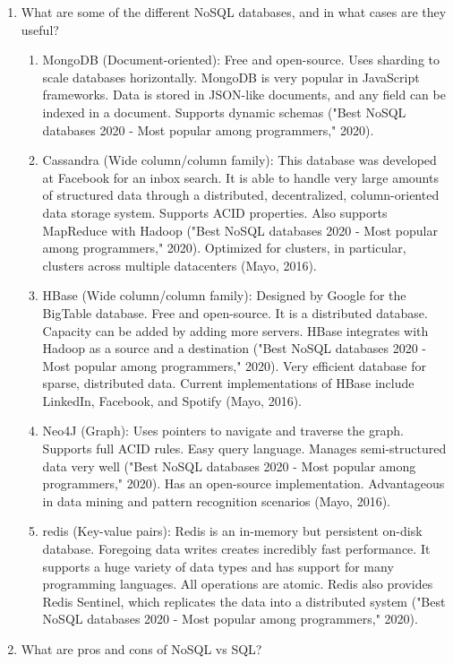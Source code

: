 \documentclass[]{article}
\begin{document}
\begin{enumerate}
	\item What are some of the different NoSQL databases, and in what cases are they useful?

	\begin{enumerate}
		\item MongoDB (Document-oriented): Free and open-source.  Uses sharding to scale databases horizontally.  MongoDB is very popular in JavaScript frameworks.  Data is stored in JSON-like documents, and any field can be indexed in a document.  Supports dynamic schemas ("Best NoSQL databases 2020 - Most popular among programmers," 2020).
		\item Cassandra (Wide column/column family):  This database was developed at Facebook for an inbox search.  It is able to handle very large amounts of structured data through a distributed, decentralized, column-oriented data storage system.  Supports ACID properties.  Also supports MapReduce with Hadoop ("Best NoSQL databases 2020 - Most popular among programmers," 2020).  Optimized for clusters, in particular, clusters across multiple datacenters (Mayo, 2016).
		\item HBase (Wide column/column family): Designed by Google for the BigTable database.  Free and open-source.  It is a distributed database.  Capacity can be added by adding more servers.  HBase integrates with Hadoop as a source and a destination ("Best NoSQL databases 2020 - Most popular among programmers," 2020).  Very efficient database for sparse, distributed data.  Current implementations of HBase include LinkedIn, Facebook, and Spotify (Mayo, 2016).
		\item Neo4J (Graph): Uses pointers to navigate and traverse the graph.  Supports full ACID rules.  Easy query language.  Manages semi-structured data very well ("Best NoSQL databases 2020 - Most popular among programmers," 2020).  Has an open-source implementation.  Advantageous in data mining and pattern recognition scenarios (Mayo, 2016).
		\item redis (Key-value pairs): Redis is an in-memory but persistent on-disk database.  Foregoing data writes creates incredibly fast performance.  It supports a huge variety of data types and has support for many programming languages.  All operations are atomic. Redis also provides Redis Sentinel, which replicates the data into a distributed system ("Best NoSQL databases 2020 - Most popular among programmers," 2020).
	\end{enumerate}
	
	\item What are pros and cons of NoSQL vs SQL?


\end{enumerate}
\end{document}
